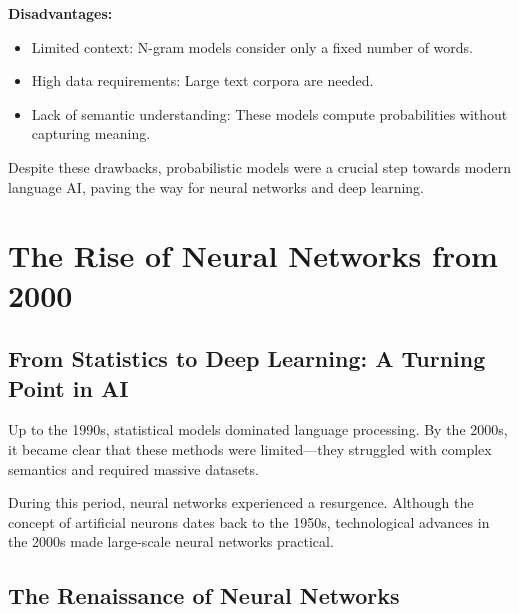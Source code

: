 \textbf{Disadvantages:}
\begin{itemize}
  \item Limited context: N-gram models consider only a fixed number of words.
  \item High data requirements: Large text corpora are needed.
  \item Lack of semantic understanding: These models compute probabilities without
        capturing meaning.
\end{itemize}

Despite these drawbacks, probabilistic models were a crucial step towards modern language AI,
paving the way for neural networks and deep learning.


\section{The Rise of Neural Networks from 2000}

\subsection{From Statistics to Deep Learning: A Turning Point in AI}

Up to the 1990s, statistical models dominated language processing. By the 2000s, it became
clear that these methods were limited—they struggled with complex semantics and required
massive datasets.

During this period, neural networks experienced a resurgence. Although the concept of
artificial neurons dates back to the 1950s, technological advances in the 2000s made
large-scale neural networks practical.

\subsection{The Renaissance of Neural Networks}

